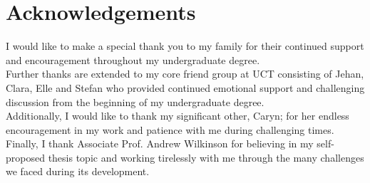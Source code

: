 \section*{Acknowledgements}
I would like to make a special thank you to my family for their continued support and encouragement throughout my undergraduate degree.\\
Further thanks are extended to my core friend group at UCT consisting of Jehan, Clara, Elle and Stefan who provided continued emotional support and challenging discussion from the beginning of my undergraduate degree.\\
Additionally, I would like to thank my significant other, Caryn; for her endless encouragement in my work and patience with me during challenging times.\\
Finally, I thank Associate Prof. Andrew Wilkinson for believing in my self-proposed thesis topic and working tirelessly with me through the many challenges we faced during its development.
\newpage